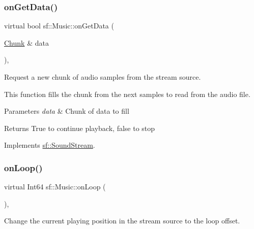 \subsubsection{\texorpdfstring{onGetData()}{onGetData()}}
{\footnotesize\ttfamily virtual bool sf\+::\+Music\+::on\+Get\+Data (\begin{DoxyParamCaption}\item[{\mbox{\hyperlink{structsf_1_1_sound_stream_1_1_chunk}{Chunk}} \&}]{data }\end{DoxyParamCaption})\hspace{0.3cm}{\ttfamily [protected]}, {\ttfamily [virtual]}}



Request a new chunk of audio samples from the stream source. 

This function fills the chunk from the next samples to read from the audio file.


\begin{DoxyParams}{Parameters}
{\em data} & Chunk of data to fill\\
\hline
\end{DoxyParams}
\begin{DoxyReturn}{Returns}
True to continue playback, false to stop \begin{DoxyVerb}\end{DoxyVerb}
 
\end{DoxyReturn}


Implements \mbox{\hyperlink{classsf_1_1_sound_stream_a968ec024a6e45490962c8a1121cb7c5f}{sf\+::\+Sound\+Stream}}.

\mbox{\label{classsf_1_1_music_aa68a64bdaf5d16e9ed64f202f5c45e03}} 
\subsubsection{\texorpdfstring{onLoop()}{onLoop()}}
{\footnotesize\ttfamily virtual Int64 sf\+::\+Music\+::on\+Loop (\begin{DoxyParamCaption}{ }\end{DoxyParamCaption})\hspace{0.3cm}{\ttfamily [protected]}, {\ttfamily [virtual]}}



Change the current playing position in the stream source to the loop offset. 

